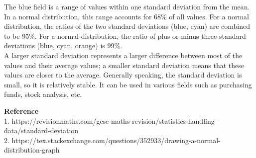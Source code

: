\documentclass[12pt]{report}
\begin{document}
\vspace{-0.4cm}
The blue field is a range of values within one standard deviation from the mean. In a normal distribution, this range accounts for 68\% of all values. For a normal distribution, the ratios of the two standard deviations (blue, cyan) are combined to be 95\%. For a normal distribution, the ratio of plus or minus three standard deviations (blue, cyan, orange) is 99\%.\\
A larger standard deviation represents a larger difference between most of the values and their average values; a smaller standard deviation means that these values are closer to the average. Generally speaking, the standard deviation is small, so it is relatively stable. It can be used in various fields such as purchasing funds, stock analysis, etc.\\
\begin{small}
\textbf{Reference}\\
1. https://revisionmaths.com/gcse-maths-revision/statistics-handling-data/standard-deviation\\
2. https://tex.stackexchange.com/questions/352933/drawing-a-normal-distribution-graph

\end{small}
\end{document}
